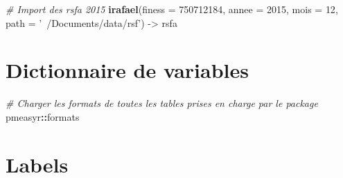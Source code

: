 \documentclass[]{book}
\newenvironment{Shaded}{\begin{snugshade}}{\end{snugshade}}
\newcommand{\CommentTok}[1]{\textcolor[rgb]{0.56,0.35,0.01}{\textit{#1}}}
\newcommand{\DataTypeTok}[1]{\textcolor[rgb]{0.13,0.29,0.53}{#1}}
\newcommand{\DecValTok}[1]{\textcolor[rgb]{0.00,0.00,0.81}{#1}}
\newcommand{\KeywordTok}[1]{\textcolor[rgb]{0.13,0.29,0.53}{\textbf{#1}}}
\newcommand{\NormalTok}[1]{#1}
\newcommand{\OperatorTok}[1]{\textcolor[rgb]{0.81,0.36,0.00}{\textbf{#1}}}
\newcommand{\StringTok}[1]{\textcolor[rgb]{0.31,0.60,0.02}{#1}}
\begin{document}
\begin{Shaded}
\begin{Highlighting}[]
\CommentTok{# Import des rsfa 2015}
\KeywordTok{irafael}\NormalTok{(}\DataTypeTok{finess =} \DecValTok{750712184}\NormalTok{,}
        \DataTypeTok{annee =} \DecValTok{2015}\NormalTok{,}
        \DataTypeTok{mois =} \DecValTok{12}\NormalTok{,}
        \DataTypeTok{path =} \StringTok{'~/Documents/data/rsf'}\NormalTok{) ->}\StringTok{ }\NormalTok{rsfa}
\end{Highlighting}
\end{Shaded}

\hypertarget{dictionnaire-de-variables}{%
\section{Dictionnaire de variables}\label{dictionnaire-de-variables}}

\begin{Shaded}
\end{Shaded}

\begin{Shaded}
\begin{Highlighting}[]
\CommentTok{# Charger les formats de toutes les tables prises en charge par le package}
\NormalTok{pmeasyr}\OperatorTok{::}\NormalTok{formats}
\end{Highlighting}
\end{Shaded}

\hypertarget{labels}{%
\section{Labels}\label{labels}}

\begin{Shaded}
\end{Shaded}
\end{document}
